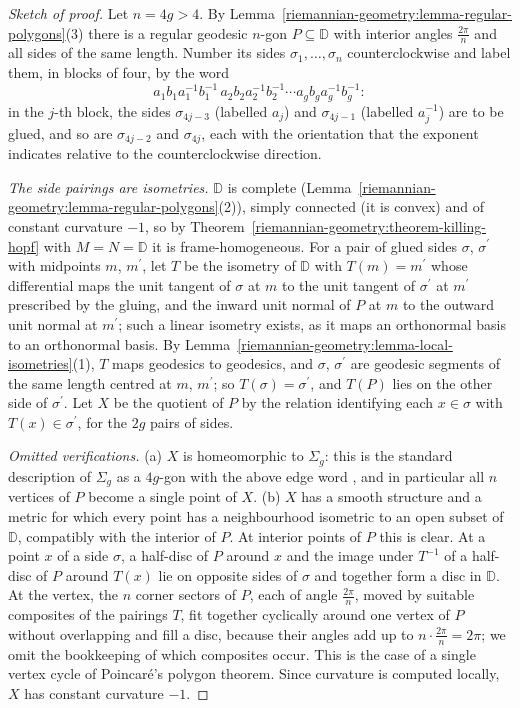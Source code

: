 \begin{proof}[Sketch of proof]
Let $n = 4g > 4$. By Lemma~\ref{riemannian-geometry:lemma-regular-polygons}(3) there is a regular geodesic $n$-gon $P \subseteq \mathbb{D}$ with interior angles $\frac{2\pi}{n}$ and all sides of the same
length. Number its sides $\sigma_1, \ldots, \sigma_n$ counterclockwise and label them, in blocks of four, by the word
\[
a_1b_1a_1^{-1}b_1^{-1}\,a_2b_2a_2^{-1}b_2^{-1} \cdots a_gb_ga_g^{-1}b_g^{-1}:
\]
in the $j$-th block, the sides $\sigma_{4j-3}$ (labelled $a_j$) and $\sigma_{4j-1}$ (labelled $a_j^{-1}$) are to be glued, and so are $\sigma_{4j-2}$ and $\sigma_{4j}$, each with the orientation that the
exponent indicates relative to the counterclockwise direction.

\emph{The side pairings are isometries.} $\mathbb{D}$ is complete (Lemma~\ref{riemannian-geometry:lemma-regular-polygons}(2)), simply connected (it is convex) and of constant curvature $-1$, so by
Theorem~\ref{riemannian-geometry:theorem-killing-hopf} with $M = N = \mathbb{D}$ it is frame-homogeneous. For a pair of glued sides $\sigma$, $\sigma^{\prime}$ with midpoints $m$, $m^{\prime}$, let $T$ be the
isometry of $\mathbb{D}$ with $T(m) = m^{\prime}$ whose differential maps the unit tangent of $\sigma$ at $m$ to the unit tangent of $\sigma^{\prime}$ at $m^{\prime}$ prescribed by the gluing, and the inward
unit normal of $P$ at $m$ to the outward unit normal at $m^{\prime}$; such a linear isometry exists, as it maps an orthonormal basis to an orthonormal basis. By
Lemma~\ref{riemannian-geometry:lemma-local-isometries}(1), $T$ maps geodesics to geodesics, and $\sigma$, $\sigma^{\prime}$ are geodesic segments of the same length centred at $m$, $m^{\prime}$; so
$T(\sigma) = \sigma^{\prime}$, and $T(P)$ lies on the other side of $\sigma^{\prime}$. Let $X$ be the quotient of $P$ by the relation identifying each $x \in \sigma$ with $T(x) \in \sigma^{\prime}$, for
the $2g$ pairs of sides.

\emph{Omitted verifications.} (a) $X$ is homeomorphic to $\Sigma_g$: this is the standard description of $\Sigma_g$ as a $4g$-gon with the above edge word \cite{hatcher-at}, and in particular all $n$
vertices of $P$ become a single point of $X$. (b) $X$ has a smooth structure and a metric for which every point has a neighbourhood isometric to an open subset of $\mathbb{D}$, compatibly with the interior
of $P$. At interior points of $P$ this is clear. At a point $x$ of a side $\sigma$, a half-disc of $P$ around $x$ and the image under $T^{-1}$ of a half-disc of $P$ around $T(x)$ lie on opposite sides of
$\sigma$ and together form a disc in $\mathbb{D}$. At the vertex, the $n$ corner sectors of $P$, each of angle $\frac{2\pi}{n}$, moved by suitable composites of the pairings $T$, fit together cyclically
around one vertex of $P$ without overlapping and fill a disc, because their angles add up to $n \cdot \frac{2\pi}{n} = 2\pi$; we omit the bookkeeping of which composites occur. This is the case of a
single vertex cycle of Poincar\'e's polygon theorem. Since curvature is computed locally, $X$ has constant curvature $-1$.


\end{proof}
